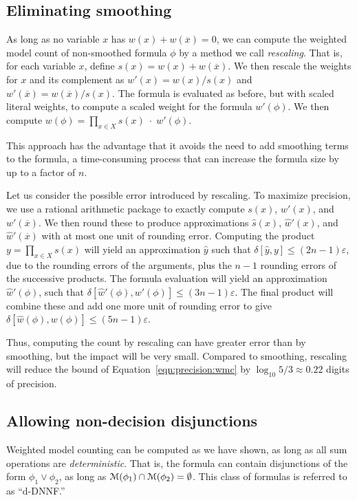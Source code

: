 \documentclass[letterpaper,USenglish,cleveref, autoref, thm-restate]{lipics-v2021}
\newcommand{\obar}[1]{\overline{#1}}
\newcommand{\approximate}[1]{\hat{#1}}
\newcommand{\approxy}{\approximate{y}}
\newcommand{\approxw}{\approximate{w}}
\newcommand{\approxs}{\approximate{s}}
\newcommand{\aerror}{\delta}
\newcommand{\roundepsilon}{\varepsilon}
\newcommand{\varset}{X}
\newcommand{\modelset}{{\cal M}}
\begin{document}
\subsection{Eliminating smoothing}

As long as no variable $x$ has $w(x) + w(\obar{x}) = 0$, we can 
compute the weighted model count of non-smoothed formula $\phi$ by a method we call
\emph{rescaling}.  That is, for each variable $x$, define $s(x) = w(x)
+ w(\obar{x})$.  We then rescale the weights for $x$ and its
complement as $w'(x) = w(x)/s(x)$ and $w'(\obar{x}) = w(\obar{x})/s(x)$.  The formula is evaluated as before, but with
scaled literal weights, to compute a scaled weight for the formula $w'(\phi)$.  We then
compute $w(\phi) = \prod_{x\in\varset} s(x) \; \cdot \; w'(\phi)$.

This approach has the advantage that it avoids the need to add
smoothing terms to the formula, a time-consuming process that can
increase the formula size by up to a factor of $n$.

Let us consider the possible error introduced by rescaling.  To maximize precision, we
use a rational arithmetic package to exactly compute $s(x)$, $w'(x)$, and $w'(\obar{x})$.  We then round these to produce
approximations $\approxs(x)$, $\approxw'(x)$, and $\approxw'(\obar{x})$ with at most one unit of rounding error.
Computing the product $y = \prod_{x\in\varset} s(x)$ will yield an approximation $\approxy$ such that
$\aerror[\approxy, y] \leq (2n-1) \roundepsilon$, due to the rounding errors of the arguments, plus the $n-1$ rounding errors of the successive products.
The formula evaluation will yield an approximation $\approxw'(\phi)$, such that
$\aerror[\approxw'(\phi), w'(\phi)] \leq (3n-1) \roundepsilon$.  The final product will combine these and add one more unit of rounding error to give
$\aerror[\approxw(\phi), w(\phi)] \leq (5n-1) \roundepsilon$.

Thus, computing the count by rescaling can have greater error than by smoothing, but the impact will be very small.
Compared to smoothing, rescaling will reduce the bound of Equation~\ref{eqn:precision:wmc} by $\log_{10} 5/3 \approx 0.22$ digits of precision.

\subsection{Allowing non-decision disjunctions}

Weighted model counting can be computed as we have shown, as long as
all sum operations are \emph{deterministic}.  That is, the formula can
contain disjunctions of the form $\phi_1 \lor \phi_2$, as long as
$\modelset(\phi_1) \cap \modelset(\phi_2) = \emptyset$.  This class of formulas is referred to as ``d-DNNF.''
\end{document}

